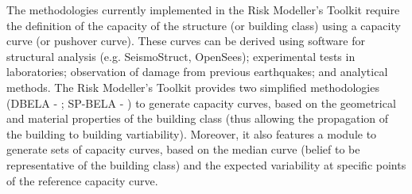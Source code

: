 The methodologies currently implemented in the Risk Modeller's Toolkit require the definition of the capacity of the structure (or building class) using a capacity curve (or pushover curve). These curves can be derived using software for structural analysis (e.g. SeismoStruct, OpenSees); experimental tests in laboratories; observation of damage from previous earthquakes; and analytical methods. The Risk Modeller's Toolkit provides two simplified methodologies (DBELA - \cite{SilvaEtAl2013}; SP-BELA - \cite{BorziEtAl2008b}) to generate capacity curves, based on the geometrical and material properties of the building class (thus allowing the propagation of the building to building vartiability). Moreover, it also features a module to generate sets of capacity curves, based on the median curve (belief to be representative of the building class) and the expected variability at specific points of the reference capacity curve.